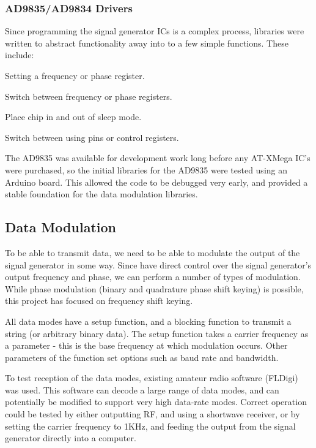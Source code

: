 \documentclass[a4paper,12pt]{article}
\newenvironment{packed_itemize}{
\begin{itemize}
  \setlength{\itemsep}{1pt}
  \setlength{\parskip}{0pt}
  \setlength{\parsep}{0pt}
}{\end{itemize}}
\begin{document}
\subsubsection{AD9835/AD9834 Drivers}
Since programming the signal generator ICs is a complex process, libraries were written to abstract functionality away into to a few simple functions. These include:
\begin{packed_itemize}
\item Setting a frequency or phase register.
\item Switch between frequency or phase registers.
\item Place chip in and out of sleep mode.
\item Switch between using pins or control registers.
\end{packed_itemize}

The AD9835 was available for development work long before any AT-XMega IC's were purchased, so the initial libraries for the AD9835 were tested using an Arduino board. This allowed the code to be debugged very early, and provided a stable foundation for the data modulation libraries.


\subsection{Data Modulation}
To be able to transmit data, we need to be able to modulate the output of the signal generator in some way. Since have direct control over the signal generator's output frequency and phase, we can perform a number of types of modulation. While phase modulation (binary and quadrature phase shift keying) is possible, this project has focused on frequency shift keying.

All data modes have a setup function, and a blocking function to transmit a string (or arbitrary binary data). The setup function takes a carrier frequency as a parameter - this is the base frequency at which modulation occurs. Other parameters of the function set options such as baud rate and bandwidth.

To test reception of the data modes, existing amateur radio software (FLDigi\citep{ref:fldigi}) was used. This software can decode a large range of data modes, and can potentially be modified to support very high data-rate modes. Correct operation could be tested by either outputting RF, and using a shortwave receiver, or by setting the carrier frequency to 1KHz, and feeding the output from the signal generator directly into a computer.
\end{document}
